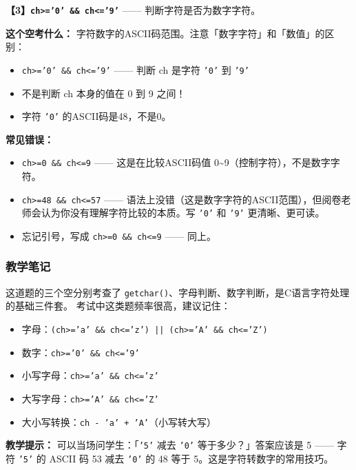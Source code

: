 \vspace{0.6em}
\textbf{【3】\texttt{ch>='0' \&\& ch<='9'}} —— 判断字符是否为数字字符。

\vspace{0.3em}
\textbf{这个空考什么：} 字符数字的ASCII码范围。注意「数字字符」和「数值」的区别：
\begin{itemize}
    \item \texttt{ch>='0' \&\& ch<='9'} —— 判断 ch 是字符 \texttt{'0'} 到 \texttt{'9'}
    \item 不是判断 ch 本身的值在 0 到 9 之间！
    \item 字符 \texttt{'0'} 的ASCII码是48，不是0。
\end{itemize}

\textbf{常见错误：}
\begin{itemize}
    \item \texttt{ch>=0 \&\& ch<=9} —— 这是在比较ASCII码值 0\~{}9（控制字符），不是数字字符。
    \item \texttt{ch>=48 \&\& ch<=57} —— 语法上没错（这是数字字符的ASCII范围），但阅卷老师会认为你没有理解字符比较的本质。写 \texttt{'0'} 和 \texttt{'9'} 更清晰、更可读。
    \item 忘记引号，写成 \texttt{ch>=0 \&\& ch<=9} —— 同上。
\end{itemize}

\subsubsection{教学笔记}

这道题的三个空分别考查了 \texttt{getchar()}、字母判断、数字判断，是C语言字符处理的基础三件套。
考试中这类题频率很高，建议记住：
\begin{itemize}
    \item 字母：\texttt{(ch>='a' \&\& ch<='z') || (ch>='A' \&\& ch<='Z')}
    \item 数字：\texttt{ch>='0' \&\& ch<='9'}
    \item 小写字母：\texttt{ch>='a' \&\& ch<='z'}
    \item 大写字母：\texttt{ch>='A' \&\& ch<='Z'}
    \item 大小写转换：\texttt{ch - 'a' + 'A'}（小写转大写）
\end{itemize}

\textbf{教学提示：} 可以当场问学生：「\texttt{'5'} 减去 \texttt{'0'} 等于多少？」答案应该是 5 —— 字符 \texttt{'5'} 的 ASCII 码 53 减去 \texttt{'0'} 的 48 等于 5。这是字符转数字的常用技巧。

\bigskip
\bigskip

